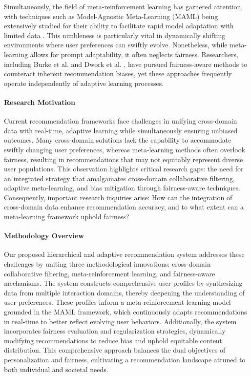 \documentclass{article} %
\begin{document}
Simultaneously, the field of meta-reinforcement learning has garnered attention, with techniques such as Model-Agnostic Meta-Learning (MAML) being extensively studied for their ability to facilitate rapid model adaptation with limited data \citep{finn2017model, nichol2018first}. This nimbleness is particularly vital in dynamically shifting environments where user preferences can swiftly evolve. Nonetheless, while meta-learning allows for prompt adaptability, it often neglects fairness. Researchers, including Burke et al. \citep{burke2018balanced} and Dwork et al. \citep{dwork2012fairness}, have pursued fairness-aware methods to counteract inherent recommendation biases, yet these approaches frequently operate independently of adaptive learning processes.

\paragraph{Research Motivation}
Current recommendation frameworks face challenges in unifying cross-domain data with real-time, adaptive learning while simultaneously ensuring unbiased outcomes. Many cross-domain solutions lack the capability to accommodate swiftly changing user preferences, whereas meta-learning methods often overlook fairness, resulting in recommendations that may not equitably represent diverse user populations. This observation highlights critical research gaps: the need for an integrated strategy that amalgamates cross-domain collaborative filtering, adaptive meta-learning, and bias mitigation through fairness-aware techniques. Consequently, important research inquiries arise: How can the integration of cross-domain data enhance recommendation accuracy, and to what extent can a meta-learning framework uphold fairness?

\paragraph{Methodology Overview}
Our proposed hierarchical and adaptive recommendation system addresses these challenges by uniting three methodological innovations: cross-domain collaborative filtering, meta-reinforcement learning, and fairness-aware mechanisms. The system constructs comprehensive user profiles by synthesizing data from multiple interaction domains, thereby deepening the understanding of user preferences. These profiles inform a meta-reinforcement learning model grounded in the MAML framework, which continuously adapts recommendations in real-time to better reflect evolving user behaviors. Additionally, the system incorporates fairness evaluation and regularization strategies, dynamically modifying recommendations to reduce bias and uphold equitable content distribution. This comprehensive approach balances the dual objectives of personalization and fairness, cultivating a recommendation landscape attuned to both individual and societal needs.
\end{document}

